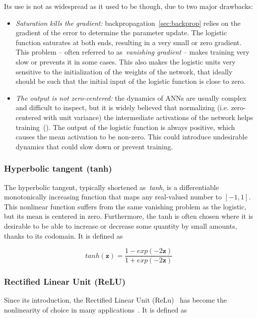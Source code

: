 Its use is not as widespread as it used to be though, due to two major
drawbacks:
\begin{itemize}
    \item \emph{Saturation kills the gradient:}
        backpropagation~\autoref{sec:backprop} relies on the gradient of the
        error to determine the parameter update. The logistic function
        saturates at both ends, resulting in a very small or zero gradient.
        This problem -- often referred to as~\emph{vanishing gradient} -- makes
        training very slow or prevents it in some cases. This also makes the
        logistic units very sensitive to the initialization of the weights of
        the network, that ideally should be such that the initial input of the
        logistic function is close to zero.
    \item \emph{The output is not zero-centered:} the dynamics of ANNs are
        usually complex and difficult to inspect, but it is widely believed
        that normalizing (i.e. zero-centered with unit variance) the
        intermediate activations of the network helps
        training~(\cite{Ioffe+Szegedy-2015,Laurent2015,arpit2016normalization,
        cooijmans2016recurrent}). The output of the logistic function is always
        positive, which causes the mean activation to be non-zero. This could
        introduce undesirable dynamics that could slow down or prevent
        training.
\end{itemize}

\subsubsection{Hyperbolic tangent (tanh)}\label{sec:tanh}

The hyperbolic tangent, typically shortened as~\emph{tanh}, is a differentiable
monotonically increasing function that maps any real-valued number to $[-1, 1]$.
This nonlinear function suffers from the same vanishing problem as the
logistic, but its mean is centered in zero. Furthermore, the tanh is often
chosen where it is desirable to be able to increase or decrease some quantity
by small amounts, thanks to its codomain. It is defined as

\begin{equation}\label{eq:tanh}
    tanh(\mathbf{z}) = \frac{1-exp(-2\mathbf{z})}{1+exp(-2\mathbf{z})}
\end{equation}


\subsubsection{Rectified Linear Unit (ReLU)}\label{sec:relu}
Since its introduction, the Rectified Linear Unit
(ReLu)~\cite{Jarrett-ICCV2009-small,Nair+Hinton-2010} has become the
nonlinearity of choice in many applications~\cite{Krizhevsky-2012,
LeCun-et-al-Nature2015,Glorot+al-AI-2011-small}. It is defined as


